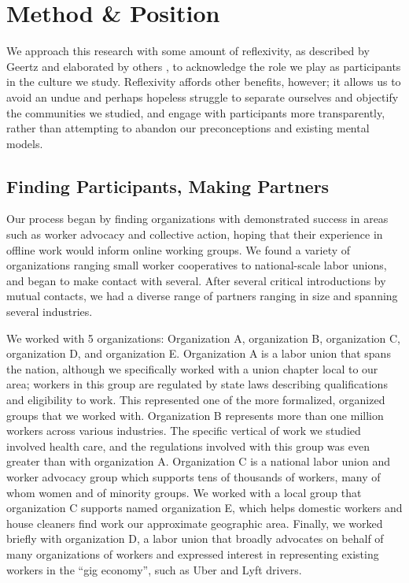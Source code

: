 \section{Method \& Position}
We approach this research with some amount of reflexivity, as described by Geertz and elaborated by others
\cite{geertz1988works,marcus1999anthropology},
to acknowledge the role we play as participants in the culture we study.
Reflexivity affords other benefits, however;
it allows us to avoid an undue and perhaps hopeless struggle to separate ourselves and objectify the communities we studied, and engage with participants more transparently, rather than attempting to abandon our preconceptions and existing mental models.


\subsection{Finding Participants, Making Partners}
Our process began by finding organizations with demonstrated success in areas such as worker advocacy and collective action, hoping that their experience in offline work would inform online working groups.
We found a variety of organizations ranging small worker cooperatives to national-scale labor unions, and began to make contact with several.
After several critical introductions by mutual contacts, we had a diverse range of partners ranging in size and spanning several industries.

We worked with 5 organizations: Organization A, organization B, organization C, organization D, and organization E.
Organization A is a labor union that spans the nation, although we specifically worked with a union chapter local to our area;
workers in this group are regulated by state laws describing qualifications and eligibility to work.
This represented one of the more formalized, organized groups that we worked with.
Organization B represents more than one million workers across various industries.
The specific vertical of work we studied involved health care, and the regulations involved with this group was even greater than with organization A.
Organization C is a national labor union and worker advocacy group which supports tens of thousands of workers, many of whom women and of minority groups.
We worked with a local group that organization C supports named organization E, which helps domestic workers and house cleaners find work our approximate geographic area.
Finally, we worked briefly with organization D,
a labor union that broadly advocates on behalf of many organizations of workers and expressed interest in representing existing workers in the ``gig economy'',
such as Uber and Lyft drivers.

